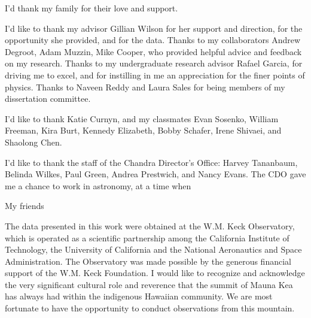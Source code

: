 \begin{acknowledgements}


I'd thank my family for their love and support.

I'd like to thank my advisor Gillian Wilson for her support and direction, for the opportunity she provided, and for the data.
Thanks to my collaborators Andrew Degroot, Adam Muzzin, Mike Cooper, who provided helpful advice and feedback on my research.
Thanks to my undergraduate research advisor Rafael Garcia, for driving me to excel, and for instilling in me an appreciation for the finer points of physics.
Thanks to Naveen Reddy and Laura Sales for being members of my dissertation committee.

I'd like to thank Katie Curnyn, and my classmates Evan Sosenko, William Freeman, Kira Burt, Kennedy Elizabeth, Bobby Schafer, Irene Shivaei, and Shaolong Chen.

I'd like to thank the staff of the Chandra Director's Office: Harvey Tananbaum, Belinda Wilkes, Paul Green, Andrea Prestwich, and Nancy Evans.
The CDO gave me a chance to work in astronomy, at a time when

My friends

The data presented in this work were obtained at the W.M. Keck Observatory, which is operated as a scientific partnership among the California Institute of Technology, the University of California and the National Aeronautics and Space Administration. The Observatory was made possible by the generous financial support of the W.M. Keck Foundation. I would like to recognize and acknowledge the very significant cultural role and reverence that the summit of Mauna Kea has always had within the indigenous Hawaiian community.  We are most fortunate to have the opportunity to conduct observations from this mountain.

\end{acknowledgements}
